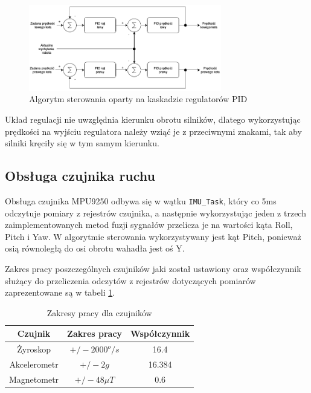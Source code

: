 \begin{figure}[h!]
    \centering
    \includegraphics[width=0.75\textwidth]{Rysunki/Rozdzial05/Algorytm_sterowania.png}
    \caption{Algorytm sterowania oparty na kaskadzie regulatorów PID}
    \label{Algorytm}
\end{figure}

Układ regulacji nie uwzględnia kierunku obrotu silników, dlatego wykorzystując prędkości na wyjściu regulatora należy wziąć je z przeciwnymi znakami, tak aby silniki kręciły się w tym samym kierunku.

\subsection{Obsługa czujnika ruchu}

Obsługa czujnika MPU9250 odbywa się w wątku \texttt{IMU\_Task}, który co 5ms odczytuje pomiary z rejestrów czujnika, a następnie wykorzystując jeden z trzech zaimplementowanych metod fuzji sygnałów przelicza je na wartości kąta Roll, Pitch i Yaw. W algorytmie sterowania wykorzystywany jest kąt Pitch, ponieważ osią równoległą do osi obrotu wahadła jest oś Y. 

Zakres pracy poszczególnych czujników jaki został ustawiony oraz współczynnik służący do przeliczenia odczytów z rejestrów dotyczących pomiarów zaprezentowane są w tabeli \ref{zakresy}.

\begin{table}[h!]
    \centering
    \caption{Zakresy pracy dla czujników}
    \begin{tabular}{|c|c|c|}
        \hline
        Czujnik & Zakres pracy & Współczynnik \\
        \hline
        Żyroskop & $+/- 2000 ^o/s$ & 16.4 \\
        \hline
        Akcelerometr & $+/- 2g$ & 16.384 \\
        \hline
        Magnetometr & $+/- 48\mu T$ & 0.6 \\
        \hline
    \end{tabular}
    \label{zakresy}
\end{table}

